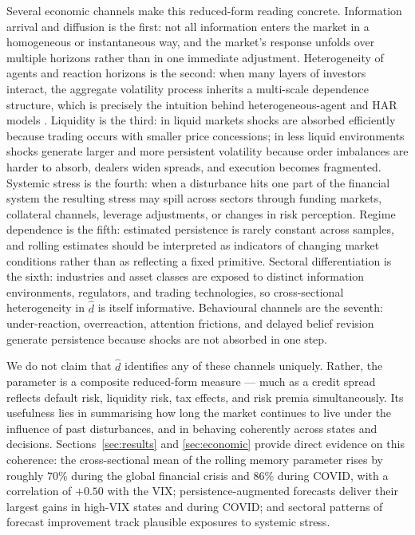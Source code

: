 \documentclass[11pt,a4paper]{article}
\newcommand{\dhat}{\hat d}
\begin{document}
Several economic channels make this reduced-form reading concrete.
Information arrival and diffusion is the first: not all information
enters the market in a homogeneous or instantaneous way, and the market's
response unfolds over multiple horizons rather than in one immediate
adjustment. Heterogeneity of agents and reaction horizons is the second:
when many layers of investors interact, the aggregate volatility process
inherits a multi-scale dependence structure, which is precisely the
intuition behind heterogeneous-agent and HAR models
\citep{muller1997volatilities,corsi2009simple}. Liquidity is the third:
in liquid markets shocks are absorbed efficiently because trading occurs
with smaller price concessions; in less liquid environments shocks
generate larger and more persistent volatility because order imbalances
are harder to absorb, dealers widen spreads, and execution becomes
fragmented. Systemic stress is the fourth: when a disturbance hits one
part of the financial system the resulting stress may spill across
sectors through funding markets, collateral channels, leverage adjustments,
or changes in risk perception. Regime dependence is the fifth: estimated
persistence is rarely constant across samples, and rolling estimates
should be interpreted as indicators of changing market conditions rather
than as reflecting a fixed primitive. Sectoral differentiation is the
sixth: industries and asset classes are exposed to distinct information
environments, regulators, and trading technologies, so cross-sectional
heterogeneity in $\dhat$ is itself informative. Behavioural channels are
the seventh: under-reaction, overreaction, attention frictions, and
delayed belief revision generate persistence because shocks are not
absorbed in one step.

We do not claim that $\dhat$ identifies any of these channels uniquely.
Rather, the parameter is a composite reduced-form measure --- much as a
credit spread reflects default risk, liquidity risk, tax effects, and risk
premia simultaneously. Its usefulness lies in summarising how long the
market continues to live under the influence of past disturbances, and in
behaving coherently across states and decisions. Sections~\ref{sec:results}
and \ref{sec:economic} provide direct evidence on this coherence: the
cross-sectional mean of the rolling memory parameter rises by roughly 70\%
during the global financial crisis and 86\% during COVID, with a
correlation of $+0.50$ with the VIX; persistence-augmented forecasts
deliver their largest gains in high-VIX states and during COVID; and
sectoral patterns of forecast improvement track plausible exposures to
systemic stress.
\end{document}

